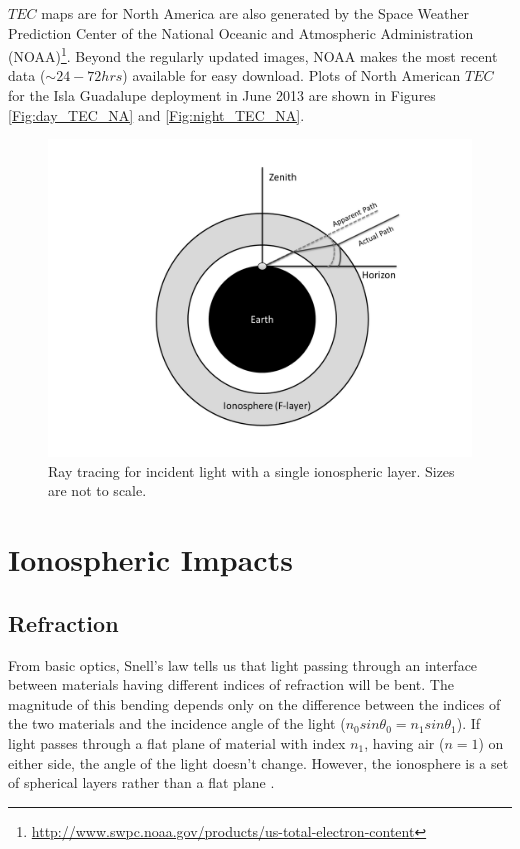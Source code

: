 $TEC$ maps are for North America are also generated by the Space Weather Prediction Center of the National Oceanic and Atmospheric Administration (NOAA)\footnote{\url{http://www.swpc.noaa.gov/products/us-total-electron-content}}. Beyond the regularly updated images, NOAA makes the most recent data ($\sim 24-72 hrs$) available for easy download. Plots of North American $TEC$ for the Isla Guadalupe deployment in June 2013 are shown in Figures \ref{Fig:day_TEC_NA} and \ref{Fig:night_TEC_NA}. 

\begin{figure}[htb]
\begin{center}
\includegraphics[width=0.95\linewidth]{Ionosphere/figures/refraction.png}
\caption{Ray tracing for incident light with a single ionospheric layer. Sizes are not to scale. }
\label{Fig:iono_refrac}
\end{center}
\end{figure}



\section{Ionospheric Impacts}


\subsection{Refraction}

From basic optics, Snell's law tells us that light passing through an interface between materials having different indices of refraction will be bent. The magnitude of this bending depends only on the difference between the indices of the two materials and the incidence angle of the light ($n_0 sin \theta_0 = n_1 sin \theta_1$). If light passes through a flat plane of material with index $n_1$, having air ($n=1$) on either side, the angle of the light doesn't change. However, the ionosphere is a set of spherical layers rather than a flat plane \cite{thompson_2001}. 


